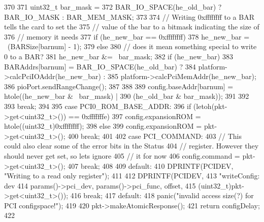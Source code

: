 \begin{DoxyCode}
{{{{{370 
371                     uint32_t bar_mask =
372                         BAR_IO_SPACE(he_old_bar) ? BAR_IO_MASK : BAR_MEM_MASK;
373 
374                     // Writing 0xffffffff to a BAR tells the card to set the
375                     // value of the bar to a bitmask indicating the size of
376                     // memory it needs
377                     if (he_new_bar == 0xffffffff) {
378                         he_new_bar = ~(BARSize[barnum] - 1);
379                     } else {
380                         // does it mean something special to write 0 to a BAR?
381                         he_new_bar &= ~bar_mask;
382                         if (he_new_bar) {
383                             BARAddrs[barnum] = BAR_IO_SPACE(he_old_bar) ?
384                                 platform->calcPciIOAddr(he_new_bar) :
385                                 platform->calcPciMemAddr(he_new_bar);
386                             pioPort.sendRangeChange();
387                         }
388                     }
389                     config.baseAddr[barnum] = htole((he_new_bar & ~bar_mask) |
390                                                     (he_old_bar & bar_mask));
391                 }
392             }
393             break;
394 
395           case PCI0_ROM_BASE_ADDR:
396             if (letoh(pkt->get<uint32_t>()) == 0xfffffffe)
397                 config.expansionROM = htole((uint32_t)0xffffffff);
398             else
399                 config.expansionROM = pkt->get<uint32_t>();
400             break;
401 
402           case PCI_COMMAND:
403             // This could also clear some of the error bits in the Status
404             // register. However they should never get set, so lets ignore
405             // it for now
406             config.command = pkt->get<uint32_t>();
407             break;
408 
409           default:
410             DPRINTF(PCIDEV, "Writing to a read only register");
411         }
412         DPRINTF(PCIDEV,
413             "writeConfig: dev %
414             params()->pci_dev, params()->pci_func, offset,
415             (uint32_t)pkt->get<uint32_t>());
416         break;
417       default:
418         panic("invalid access size(?) for PCI configspace!\n");
419     }
420     pkt->makeAtomicResponse();
421     return configDelay;
422 }
\end{DoxyCode}


